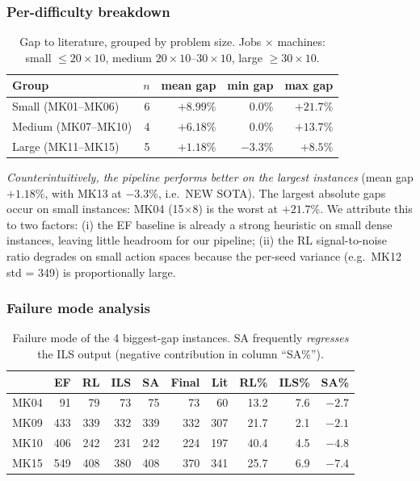 \documentclass[10pt]{article}
\theoremstyle{definition}
\newcommand{\ie}{i.e.\!}
\newcommand{\eg}{e.g.\!}
\begin{document}
\subsubsection{Per-difficulty breakdown}

\begin{table}[h]
\centering
\caption{Gap to literature, grouped by problem size.
Jobs $\times$ machines: small $\le 20{\times}10$, medium
$20{\times}10$--$30{\times}10$, large $\ge 30{\times}10$.}
\label{tab:difficulty}
\small
\begin{tabular}{lrrrr}
\toprule
Group & $n$ & \textbf{mean gap} & \textbf{min gap} & \textbf{max gap} \\
\midrule
Small (MK01--MK06)  & 6 & $+8.99\%$ & $0.0\%$  & $+21.7\%$ \\
Medium (MK07--MK10) & 4 & $+6.18\%$ & $0.0\%$  & $+13.7\%$ \\
Large  (MK11--MK15) & 5 & $+1.18\%$ & $-3.3\%$ & $+8.5\%$ \\
\bottomrule
\end{tabular}
\end{table}

\emph{Counterintuitively, the pipeline performs \emph{better}
on the largest instances} (mean gap $+1.18\%$, with MK13 at
$-3.3\%$, \ie\ NEW SOTA). The largest absolute gaps occur on
small instances: MK04 (15$\times$8) is the worst at
$+21.7\%$. We attribute this to two factors: (i) the EF
baseline is already a strong heuristic on small dense
instances, leaving little headroom for our pipeline; (ii) the
RL signal-to-noise ratio degrades on small action spaces
because the per-seed variance (\eg\ MK12 std = 349) is
proportionally large.

\subsubsection{Failure mode analysis}

\begin{table}[h]
\centering
\caption{Failure mode of the 4 biggest-gap instances. SA
frequently \emph{regresses} the ILS output (negative
contribution in column ``SA\%'').}
\label{tab:failure}
\small
\begin{tabular}{lrrrrrr|rrr}
\toprule
& \textbf{EF} & \textbf{RL} & \textbf{ILS} & \textbf{SA} & \textbf{Final} & \textbf{Lit} & \textbf{RL\%} & \textbf{ILS\%} & \textbf{SA\%} \\
\midrule
MK04 & 91  & 79  & 73  & 75  & 73  & 60  & 13.2 & 7.6  & $-2.7$ \\
MK09 & 433 & 339 & 332 & 339 & 332 & 307 & 21.7 & 2.1  & $-2.1$ \\
MK10 & 406 & 242 & 231 & 242 & 224 & 197 & 40.4 & 4.5  & $-4.8$ \\
MK15 & 549 & 408 & 380 & 408 & 370 & 341 & 25.7 & 6.9  & $-7.4$ \\
\bottomrule
\end{tabular}
\end{table}
\end{document}
